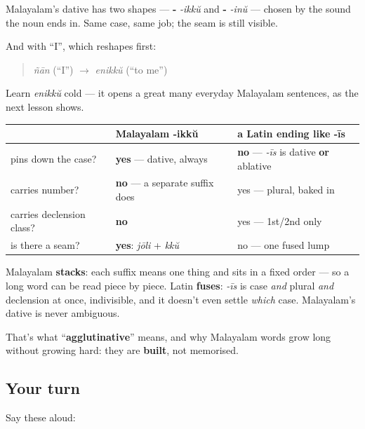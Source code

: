 Malayalam's dative has two shapes — \textbf{-} \emph{-ikkŭ} and \textbf{-} \emph{-inŭ} — chosen by the sound the noun ends in. Same case, same job; the seam is still visible.

And with \textquotedblleft{}I\textquotedblright{}, which reshapes first:

\begin{quote}
\textbf{} \emph{ñān} (\textquotedblleft{}I\textquotedblright{}) $\to$ \textbf{} \emph{enikkŭ} (\textquotedblleft{}to me\textquotedblright{})
\end{quote}

Learn \emph{enikkŭ} cold — it opens a great many everyday Malayalam sentences, as the next lesson shows.

\begin{culture}
\noindent
\begin{tabularx}{\linewidth}{@{}>{\raggedright\arraybackslash}X>{\raggedright\arraybackslash}X>{\raggedright\arraybackslash}X@{}}
\toprule
\textbf{} & \textbf{Malayalam \textbf{-ikkŭ}} & \textbf{a Latin ending like \textbf{-īs}} \\
\midrule
pins down the case? & \textbf{yes} — dative, always & \textbf{no} — \emph{-īs} is dative \textbf{or} ablative \\
carries number? & \textbf{no} — a separate suffix does & yes — plural, baked in \\
carries declension class? & \textbf{no} & yes — 1st/2nd only \\
is there a seam? & \textbf{yes}: \emph{jōli} + \emph{kkŭ} & no — one fused lump \\
\bottomrule
\end{tabularx}

Malayalam \textbf{stacks}: each suffix means one thing and sits in a fixed order — so a long word can be read piece by piece. Latin \textbf{fuses}: \emph{-īs} is case \emph{and} plural \emph{and} declension at once, indivisible, and it doesn't even settle \emph{which} case. Malayalam's dative is never ambiguous.

That's what \textquotedblleft{}\textbf{agglutinative}\textquotedblright{} means, and why Malayalam words grow long without growing hard: they are \textbf{built}, not memorised.
\end{culture}

\subsection*{Your turn}
Say these aloud:


